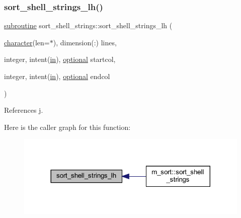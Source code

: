 \subsubsection{\texorpdfstring{sort\+\_\+shell\+\_\+strings\+\_\+lh()}{sort\_shell\_strings\_lh()}}
{\footnotesize\ttfamily \hyperlink{M__stopwatch_83_8txt_acfbcff50169d691ff02d4a123ed70482}{subroutine} sort\+\_\+shell\+\_\+strings\+::sort\+\_\+shell\+\_\+strings\+\_\+lh (\begin{DoxyParamCaption}\item[{\hyperlink{option__stopwatch_83_8txt_abd4b21fbbd175834027b5224bfe97e66}{character}(len=$\ast$), dimension(\+:)}]{lines,  }\item[{integer, intent(\hyperlink{M__journal_83_8txt_afce72651d1eed785a2132bee863b2f38}{in}), \hyperlink{option__stopwatch_83_8txt_aa4ece75e7acf58a4843f70fe18c3ade5}{optional}}]{startcol,  }\item[{integer, intent(\hyperlink{M__journal_83_8txt_afce72651d1eed785a2132bee863b2f38}{in}), \hyperlink{option__stopwatch_83_8txt_aa4ece75e7acf58a4843f70fe18c3ade5}{optional}}]{endcol }\end{DoxyParamCaption})\hspace{0.3cm}{\ttfamily [private]}}



References j.

Here is the caller graph for this function\+:
\nopagebreak
\begin{figure}[H]
\begin{center}
\leavevmode
\includegraphics[width=317pt]{M__sort_8f90_a4a1eed2e76f3429d7eb5cd2ae5b50fa1_icgraph}
\end{center}
\end{figure}
